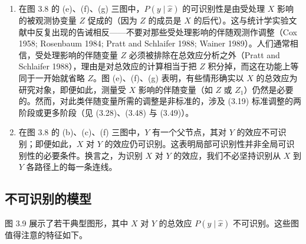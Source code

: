\begin{enumerate}[label=\arabic*.,leftmargin=1.8em]
\begin{equation}
P(y\mid\hat{x})=\sum_{z_1,z_2}P(y\mid z_1,z_2,x)P(z_1\mid x)\sum_{x'}P(z_2\mid z_1,x')P(x'). \tag{3.48}
\end{equation}
对图 3.8 的图 (g) 作类似推导，得到
\begin{equation}
P(y\mid\hat{x})=\sum_{z_1}\sum_{z_2}\sum_{x'}P(y\mid z_1,z_2,x')P(z_1\mid z_2,x)P(z_2). \tag{3.49}
\end{equation}
注意变量 $Z_3$ 未出现在 \textup{(3.49)} 中，这意味着若只想了解 $X$ 对 $Y$ 的因果效应，$Z_3$ 无须被测量。
\item 在图 3.8 的 (e)、(f)、(g) 三图中，$P(y\mid\hat{x})$ 的可识别性是由受处理 $X$ 影响的被观测协变量 $Z$ 促成的（因为 $Z$ 的成员是 $X$ 的后代）。这与统计学实验文献中反复出现的告诫相反——不要对那些受处理影响的伴随观测作调整（Cox 1958; Rosenbaum 1984; Pratt and Schlaifer 1988; Wainer 1989）。人们通常相信，受处理影响的伴随变量 $Z$ 必须被排除在总效应分析之外（Pratt and Schlaifer 1988），理由是对总效应的计算相当于把 $Z$ 积分掉，而这在功能上等同于一开始就省略 $Z$。图 (e)、(f)、(g) 表明，有些情形确实以 $X$ 的总效应为研究对象，即便如此，测量受 $X$ 影响的伴随变量（如 $Z$ 或 $Z_1$）仍然是必要的。然而，对此类伴随变量所需的调整是非标准的，涉及 \textup{(3.19)} 标准调整的两阶段或更多阶段（见 \textup{(3.28)}、\textup{(3.48)} 与 \textup{(3.49)}）。
\item 在图 3.8 的 (b)、(c)、(f) 三图中，$Y$ 有一个父节点，其对 $Y$ 的效应不可识别；即便如此，$X$ 对 $Y$ 的效应仍可识别。这表明局部可识别性并非全局可识别性的必要条件。换言之，为识别 $X$ 对 $Y$ 的效应，我们不必坚持识别从 $X$ 到 $Y$ 各路径上的每一条连线。
\end{enumerate}

\subsection{不可识别的模型}

图 3.9 展示了若干典型图形，其中 $X$ 对 $Y$ 的总效应 $P(y\mid\hat{x})$ 不可识别。这些图值得注意的特征如下。

